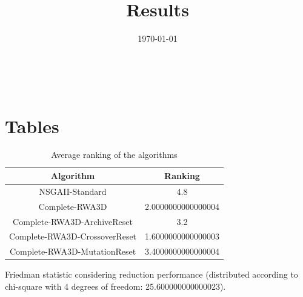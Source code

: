 \documentclass{article}
\title{Results}
\author{}
\date{\today}
\begin{document}
\oddsidemargin 0in \topmargin 0in\maketitle
\
\section{Tables}
\begin{table}[!htp]
\centering
\caption{Average ranking of the algorithms}
\begin{tabular}{c|c}
Algorithm&Ranking\\
\hline
NSGAII-Standard&4.8\\
Complete-RWA3D&2.0000000000000004\\
Complete-RWA3D-ArchiveReset&3.2\\
Complete-RWA3D-CrossoverReset&1.6000000000000003\\
Complete-RWA3D-MutationReset&3.4000000000000004\\
\end{tabular}
\end{table}


Friedman statistic considering reduction performance (distributed according to chi-square with 4 degrees of freedom: 25.600000000000023).
\end{document}
